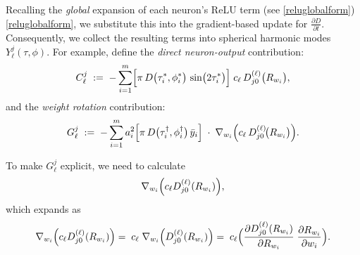 \documentclass[review,onefignum,onetabnum,onealgnum]{siamart250106}
\numberwithin{theorem}{section}
\begin{document}
Recalling the \emph{global} expansion of each neuron’s ReLU term (see \eqref{reluglobalform}) \eqref{reluglobalform}, we substitute this into the gradient-based update for $\tfrac{\partial D}{\partial t}$.  Consequently, we collect the resulting terms into spherical harmonic modes \(Y_{\ell}^j(\tau,\phi)\).  For example, define the \emph{direct neuron-output} contribution:
\begin{equation}\label{Cellj}
    C_{\ell}^j 
    \;:=\; 
    -\sum_{i=1}^m 
    \Bigl[\pi\,D\bigl(\tau_i^*,\phi_i^*\bigr)\,\sin\bigl(2\tau_i^*\bigr)\Bigr]\;
    c_{\ell}
    \,D_{j0}^{(\ell)}\bigl(R_{w_i}\bigr),
\end{equation}
and the \emph{weight rotation} contribution:
\begin{equation}\label{Gellj}
    G_{\ell}^j 
    \;:=\; 
    -\sum_{i=1}^m 
    a_i^2
    \Bigl[\pi\,D\bigl(\tau_i^\dagger,\phi_i^\dagger\bigr)\,\bar{y}_i\Bigr]
    \;\cdot\;
    \nabla_{w_i}\Bigl(
      c_{\ell}\,D_{j0}^{(\ell)}\!\bigl(R_{w_i}\bigr)
    \Bigr).
\end{equation}

 To make $G_{\ell}^j$ explicit, we need to calculate
\[
\nabla_{w_i}\Bigl(c_{\ell} D_{j0}^{(\ell)}(R_{w_i})\Bigr),
\]
which expands as
$$
\begin{aligned}
 \nabla_{w_i}\Bigl(c_{\ell} D_{j0}^{(\ell)}(R_{w_i})\Bigr) =\; c_{\ell}\;\nabla_{w_i}\Bigl(D_{j0}^{(\ell)}(R_{w_i})\Bigr) =\; c_{\ell}\Bigl(\frac{\partial D_{j0}^{(\ell)}(R_{w_i})}{\partial R_{w_i}}\;\frac{\partial R_{w_i}}{\partial w_i}\Bigr).
\end{aligned}
$$
\end{document}
